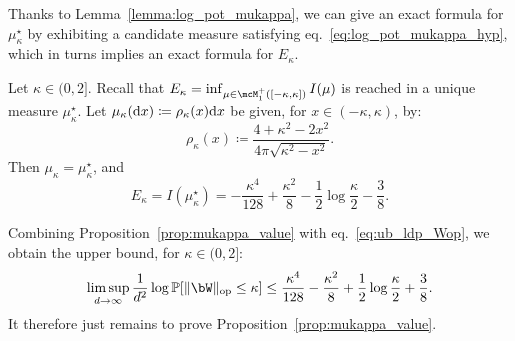 \noindent
Thanks to Lemma~\ref{lemma:log_pot_mukappa}, we can give an exact formula for $\mu_\kappa^\star$ by exhibiting a candidate measure satisfying eq.~\eqref{eq:log_pot_mukappa_hyp}, which in turns implies an exact formula for $E_\kappa$.
\begin{proposition}
    \label{prop:mukappa_value}
    Let $\kappa \in (0,2]$.
    Recall that $E_\kappa = \inf_{\mu \in \mcM_1^+([-\kappa,\kappa])} I(\mu)$ is reached in a unique measure $\mu_\kappa^\star$.
    Let $\mu_\kappa(\mathrm{d} x) \coloneqq \rho_\kappa(x) \mathrm{d} x$ be given, for $x \in (-\kappa,\kappa)$, by:
    \begin{equation}\label{eq:def_rhokappa}
        \rho_\kappa(x) \coloneqq \frac{4+\kappa^2-2x^2}{4 \pi \sqrt{\kappa^2 - x^2}}. 
    \end{equation}
    Then $\mu_\kappa = \mu_\kappa^\star$, and 
    \begin{equation*}
        E_\kappa = I(\mu_\kappa^\star) = - \frac{\kappa^4}{128} + \frac{\kappa^2}{8} - \frac{1}{2} \log \frac{\kappa}{2} - \frac{3}{8}.
    \end{equation*}
\end{proposition}
\noindent
Combining Proposition~\ref{prop:mukappa_value} with eq.~\eqref{eq:ub_ldp_Wop}, we obtain the upper bound, 
for $\kappa \in (0,2]$:
\begin{equation}
        \limsup_{d \to \infty} \frac{1}{d^2} \log \bbP[\|\bW\|_\op \leq \kappa] 
        \leq \frac{\kappa^4}{128} - \frac{\kappa^2}{8} + \frac{1}{2} \log \frac{\kappa}{2} + \frac{3}{8}.
\end{equation}
It therefore just remains to prove Proposition~\ref{prop:mukappa_value}.
